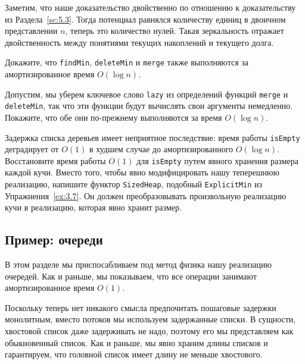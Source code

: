 \begin{remark}
  Заметим, что наше доказательство двойственно по отношению к
  доказательству из Раздела~\ref{sc:5.3}. Тогда
  потенциал равнялся количеству единиц в двоичном представлении $n$,
  теперь это количество нулей. Такая зеркальность отражает двойственность
  между понятиями текущих накоплений и текущего долга.
\end{remark}

\begin{exercise}\label{ex:6.3}
  Докажите, что \lstinline!findMin!, \lstinline!deleteMin! и
  \lstinline!merge! также выполняются за амортизированное время
  $O(\log n)$.
\end{exercise}

\begin{exercise}\label{ex:6.4}
  Допустим, мы уберем ключевое слово \lstinline!lazy! из определений
  функций \lstinline!merge! и \lstinline!deleteMin!, так что эти
  функции будут вычислять свои аргументы немедленно. Покажите, что обе
  они по-прежнему выполняются за время $O(\log n)$.
\end{exercise}

\begin{exercise}\label{ex:6.5}
  Задержка списка деревьев имеет неприятное последствие: время работы
  \lstinline!isEmpty! деградирует от $O(1)$ в худшем случае до
  амортизированного $O(\log n)$. Восстановите время работы $O(1)$ для
  \lstinline!isEmpty! путем явного хранения размера каждой
  кучи.  Вместо того, чтобы явно модифицировать нашу теперешнюю
  реализацию, напишите функтор \lstinline!SizedHeap!, подобный
  \lstinline!ExplicitMin! из Упражнения~\ref{ex:3.7}. Он должен
  преобразовывать произвольную реализацию кучи в реализацию, которая
  явно хранит размер.
\end{exercise}

\subsection{Пример: очереди}
\label{sc:6.4.2}

В этом разделе мы приспосабливаем под метод физика нашу реализацию
очередей. Как и раньше, мы показываем, что все операции занимают
амортизированное время $O(1)$.

Поскольку теперь нет никакого смысла предпочитать пошаговые задержки
монолитным, вместо потоков мы используем задержанные списки. В
сущности, хвостовой список даже задерживать не надо, поэтому его мы
представляем как обыкновенный список.  Как и раньше, мы явно храним
длины списков и гарантируем, что головной список имеет длину не меньше
хвостового.

